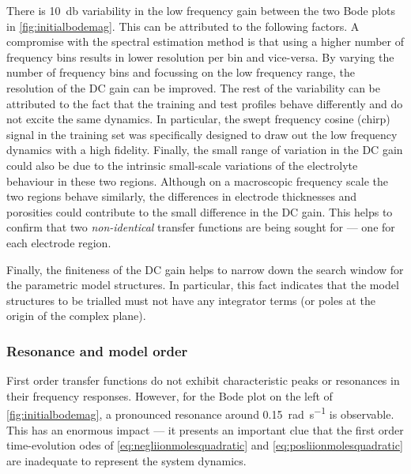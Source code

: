 There is \approx\SI{10}{\decibel} variability in  the low frequency gain between
the two Bode  plots in \cref{fig:initialbodemag}. This can be  attributed to the
following  factors. A  compromise with  the spectral  estimation method  is that
using a higher number of frequency bins  results in lower resolution per bin and
vice-versa. By  varying the number  of frequency bins  and focussing on  the low
frequency range, the resolution of the DC  gain can be improved. The rest of the
variability can  be attributed to the  fact that the training  and test profiles
behave differently and do not excite the same dynamics. In particular, the swept
frequency cosine (chirp) signal in the training set was specifically designed to
draw out  the low frequency  dynamics with a  high fidelity. Finally,  the small
range of variation in the DC gain could also be due to the intrinsic small-scale
variations of  the electrolyte  behaviour in  these two  regions. Although  on a
macroscopic frequency scale the two regions behave similarly, the differences in
electrode thicknesses and porosities could contribute to the small difference in
the  DC gain.  This  helps  to confirm  that  two \emph{non-identical}  transfer
functions are being sought for --- one for each electrode region.

Finally, the finiteness  of the DC gain  helps to narrow down  the search window
for the parametric model structures. In particular, this fact indicates that the
model structures to be trialled must not  have any integrator terms (or poles at
the origin of the complex plane).

\subsubsection*{Resonance and model order}

First  order  transfer   functions  do  not  exhibit   characteristic  peaks  or
resonances  in  their  frequency  responses.  However,  for  the  Bode  plot  on
the   left   of \cref{fig:initialbodemag},   a   pronounced   resonance   around
\SI{0.15}{\radian\per\second} is observable. This has  an enormous impact --- it
presents  an important  clue  that the  first  order time-evolution  \glspl{ode}
of \cref{eq:negliionmolesquadratic}   and \cref{eq:posliionmolesquadratic}   are
inadequate to represent the system dynamics.

